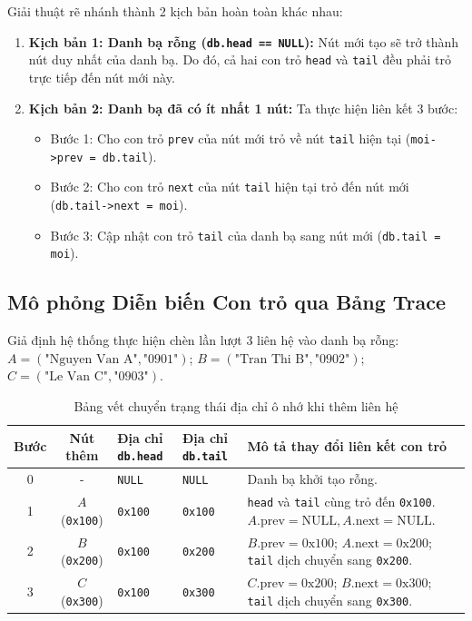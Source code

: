 \documentclass[12pt,a4paper]{report}
\begin{document}
Giải thuật rẽ nhánh thành 2 kịch bản hoàn toàn khác nhau:
\begin{enumerate}
    \item \textbf{Kịch bản 1: Danh bạ rỗng (\texttt{db.head == NULL}):}
    Nút mới tạo sẽ trở thành nút duy nhất của danh bạ. Do đó, cả hai con trỏ \texttt{head} và \texttt{tail} đều phải trỏ trực tiếp đến nút mới này.
    \item \textbf{Kịch bản 2: Danh bạ đã có ít nhất 1 nút:}
    Ta thực hiện liên kết 3 bước:
    \begin{itemize}
        \item Bước 1: Cho con trỏ \texttt{prev} của nút mới trỏ về nút \texttt{tail} hiện tại (\texttt{moi->prev = db.tail}).
        \item Bước 2: Cho con trỏ \texttt{next} của nút \texttt{tail} hiện tại trỏ đến nút mới (\texttt{db.tail->next = moi}).
        \item Bước 3: Cập nhật con trỏ \texttt{tail} của danh bạ sang nút mới (\texttt{db.tail = moi}).
    \end{itemize}
\end{enumerate}

\subsection{Mô phỏng Diễn biến Con trỏ qua Bảng Trace}
Giả định hệ thống thực hiện chèn lần lượt 3 liên hệ vào danh bạ rỗng: 
$A = (\text{"Nguyen Van A"}, \text{"0901"})$; 
$B = (\text{"Tran Thi B"}, \text{"0902"})$; 
$C = (\text{"Le Van C"}, \text{"0903"})$.

\begin{table}[htbp]
    \centering
    \small
    \begin{tabular}{|c|c|p{3cm}|p{3cm}|p{5cm}|}
    \hline
    \textbf{Bước} & \textbf{Nút thêm} & \textbf{Địa chỉ \texttt{db.head}} & \textbf{Địa chỉ \texttt{db.tail}} & \textbf{Mô tả thay đổi liên kết con trỏ} \\ \hline
    0 & - & \texttt{NULL} & \texttt{NULL} & Danh bạ khởi tạo rỗng. \\ \hline
    1 & $A$ (\texttt{0x100}) & \texttt{0x100} & \texttt{0x100} & \texttt{head} và \texttt{tail} cùng trỏ đến \texttt{0x100}. $A.\text{prev}=\text{NULL}, A.\text{next}=\text{NULL}$. \\ \hline
    2 & $B$ (\texttt{0x200}) & \texttt{0x100} & \texttt{0x200} & $B.\text{prev} = \text{0x100}$; $A.\text{next} = \text{0x200}$; \texttt{tail} dịch chuyển sang \texttt{0x200}. \\ \hline
    3 & $C$ (\texttt{0x300}) & \texttt{0x100} & \texttt{0x300} & $C.\text{prev} = \text{0x200}$; $B.\text{next} = \text{0x300}$; \texttt{tail} dịch chuyển sang \texttt{0x300}. \\ \hline
    \end{tabular}
    \caption{Bảng vết chuyển trạng thái địa chỉ ô nhớ khi thêm liên hệ}
\end{table}
\end{document}
